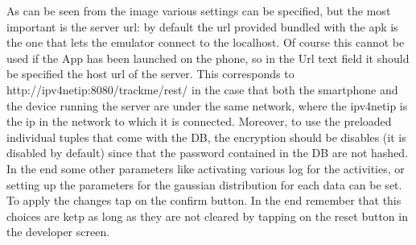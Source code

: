 As can be seen from the image various settings can be specified, but the most important is the server url: by default the url provided bundled with the apk is the one that lets the emulator connect to the localhost. Of course this cannot be used if the App has been launched on the phone, so in the Url text field it should be specified the host url of the server. This corresponds  to http://ipv4netip:8080/trackme/rest/ in the case that both the smartphone and the device running the server are under the same network, where the ipv4netip is the ip in the network to which it is connected.
Moreover, to use the preloaded individual tuples that come with the DB, the encryption should be disables (it is disabled by default) since that the password contained in the DB are not hashed.
In the end some other parameters like activating various log for the activities, or setting up the parameters for the gaussian distribution for each data can be set.
To apply the changes tap on the confirm button.
In the end remember that this choices are ketp as long as they are not cleared by tapping on the reset button in the developer screen.



